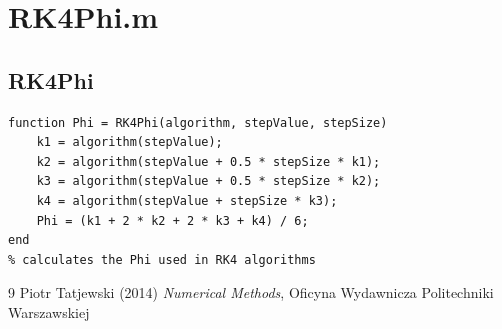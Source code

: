 \section{RK4Phi.m}
\subsection{RK4Phi}
\begin{simplechar}
\begin{lstlisting}
function Phi = RK4Phi(algorithm, stepValue, stepSize)
    k1 = algorithm(stepValue);
    k2 = algorithm(stepValue + 0.5 * stepSize * k1);
    k3 = algorithm(stepValue + 0.5 * stepSize * k2);
    k4 = algorithm(stepValue + stepSize * k3);
    Phi = (k1 + 2 * k2 + 2 * k3 + k4) / 6;
end
% calculates the Phi used in RK4 algorithms

\end{lstlisting}
\end{simplechar}




\begin{thebibliography}{9}
Piotr Tatjewski (2014) \emph{Numerical Methods}, Oficyna Wydawnicza Politechniki Warszawskiej
\end{thebibliography}


